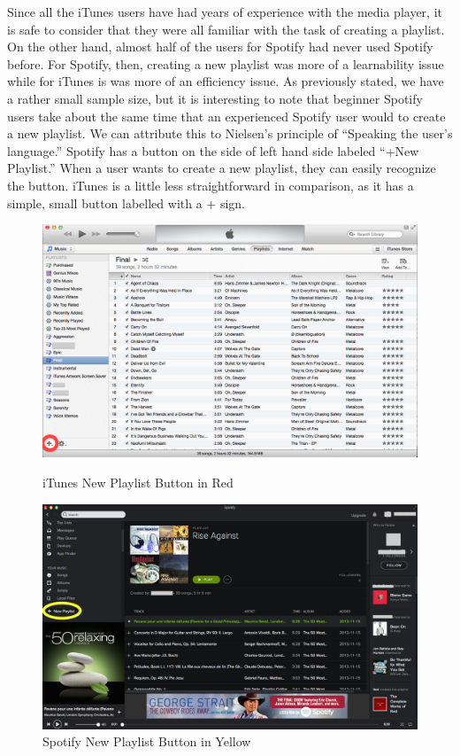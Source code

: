 \documentclass[11pt]{article}
\begin{document}
Since all the iTunes users have had years of experience with the media player, it is safe to consider that they were all familiar with the task of creating a playlist. On the other hand, almost half of the users for Spotify had never used Spotify before. For Spotify, then, creating a new playlist was more of a learnability issue while for iTunes is was more of an efficiency issue. As previously stated, we have a rather small sample size, but it is interesting to note that beginner Spotify users take about the same time that an experienced Spotify user would to create a new playlist. We can attribute this to Nielsen's principle of ``Speaking the user's language.'' Spotify has a button on the side of left hand side labeled ``+New Playlist.'' When a user wants to create a new playlist, they can easily recognize the button. iTunes is a little less straightforward in comparison, as it has a simple, small button labelled with a + sign.
%


\begin{figure}[H] %
   \centering
   \includegraphics[width=5.5in]{iTunes_new_playlist.png}
   \caption{iTunes New Playlist Button in Red}   
   \includegraphics[width=5.5in]{spotify_new_playlist.png}
   \caption{Spotify New Playlist Button in Yellow}                                    
   \label{fig:iTunes_new_playlist}
\end{figure}
\end{document}
